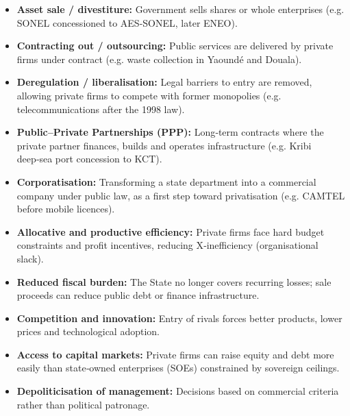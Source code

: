 \documentclass[11pt]{article}
\begin{document}
\begin{aretenir}
\begin{itemize}
    \item \textbf{Asset sale / divestiture:} Government sells shares or whole enterprises (e.g. SONEL concessioned to AES-SONEL, later ENEO).
    \item \textbf{Contracting out / outsourcing:} Public services are delivered by private firms under contract (e.g. waste collection in Yaoundé and Douala).
    \item \textbf{Deregulation / liberalisation:} Legal barriers to entry are removed, allowing private firms to compete with former monopolies (e.g. telecommunications after the 1998 law).
    \item \textbf{Public–Private Partnerships (PPP):} Long‑term contracts where the private partner finances, builds and operates infrastructure (e.g. Kribi deep‑sea port concession to KCT).
    \item \textbf{Corporatisation:} Transforming a state department into a commercial company under public law, as a first step toward privatisation (e.g. CAMTEL before mobile licences).
\end{itemize}
\end{aretenir}

\begin{propriete}
\begin{itemize}
    \item \textbf{Allocative and productive efficiency:} Private firms face hard budget constraints and profit incentives, reducing X‑inefficiency (organisational slack).
    \item \textbf{Reduced fiscal burden:} The State no longer covers recurring losses; sale proceeds can reduce public debt or finance infrastructure.
    \item \textbf{Competition and innovation:} Entry of rivals forces better products, lower prices and technological adoption.
    \item \textbf{Access to capital markets:} Private firms can raise equity and debt more easily than state‑owned enterprises (SOEs) constrained by sovereign ceilings.
    \item \textbf{Depoliticisation of management:} Decisions based on commercial criteria rather than political patronage.
\end{itemize}
\end{propriete}
\end{document}
